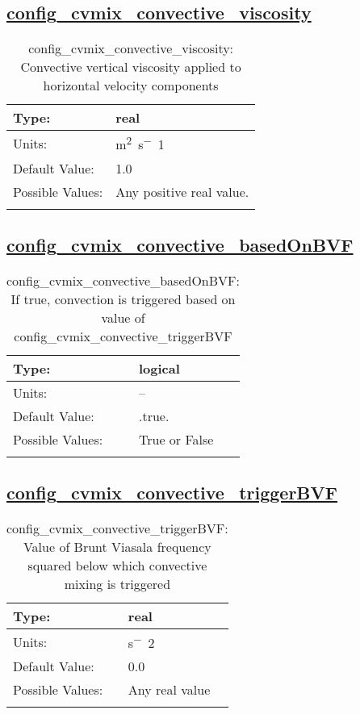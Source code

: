 \subsection[config\_cvmix\_convective\_viscosity]{\hyperref[sec:nm_tab_cvmix]{config\_cvmix\_convective\_viscosity}}
\label{subsec:nm_sec_config_cvmix_convective_viscosity}
\begin{center}
\begin{longtable}{| p{2.0in} || p{4.0in} |}
    \hline
    Type: & real \\
    \hline
    Units: & \si{m^2.s^-1} \\
    \hline
    Default Value: & 1.0 \\
    \hline
    Possible Values: & Any positive real value. \\
    \hline
    \caption{config\_cvmix\_convective\_viscosity: Convective vertical viscosity applied to horizontal velocity components}
\end{longtable}
\end{center}
\subsection[config\_cvmix\_convective\_basedOnBVF]{\hyperref[sec:nm_tab_cvmix]{config\_cvmix\_convective\_basedOnBVF}}
\label{subsec:nm_sec_config_cvmix_convective_basedOnBVF}
\begin{center}
\begin{longtable}{| p{2.0in} || p{4.0in} |}
    \hline
    Type: & logical \\
    \hline
    Units: & -- \\
    \hline
    Default Value: & .true. \\
    \hline
    Possible Values: & True or False \\
    \hline
    \caption{config\_cvmix\_convective\_basedOnBVF: If true, convection is triggered based on value of config\_cvmix\_convective\_triggerBVF}
\end{longtable}
\end{center}
\subsection[config\_cvmix\_convective\_triggerBVF]{\hyperref[sec:nm_tab_cvmix]{config\_cvmix\_convective\_triggerBVF}}
\label{subsec:nm_sec_config_cvmix_convective_triggerBVF}
\begin{center}
\begin{longtable}{| p{2.0in} || p{4.0in} |}
    \hline
    Type: & real \\
    \hline
    Units: & \si{s^-2} \\
    \hline
    Default Value: & 0.0 \\
    \hline
    Possible Values: & Any real value \\
    \hline
    \caption{config\_cvmix\_convective\_triggerBVF: Value of Brunt Viasala frequency squared below which convective mixing is triggered}
\end{longtable}
\end{center}
